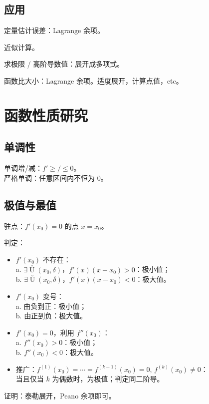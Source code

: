 \documentclass[12pt, a4paper, UTF8, openany]{ctexbook}
\newcommand{\difk}[2]{{#1}^{(#2)}}
\newcommand{\uzero}{\mathop{U}\limits^{\circ}}%
\begin{document}
        \subsection{应用}
        定量估计误差：Lagrange 余项。

        近似计算。

        求极限 / 高阶导数值：展开成多项式。

        函数比大小：Lagrange 余项。适度展开，计算点值，etc。

    \section{函数性质研究}
        \subsection{单调性}
        单调增/减：$f' \geqslant / \leqslant 0$。\\
        严格单调：任意区间内不恒为 0。

        \subsection{极值与最值}
        驻点：$f'(x_0) = 0$ 的点 $x = x_0$。

        判定：
        \begin{itemize}
            \item $f'(x_0)$ 不存在：\\
                a. $\exists \uzero(x_0, \delta)$，$f'(x)(x - x_0) > 0$：极小值；\\
                b. $\exists \uzero(x_0, \delta)$，$f'(x)(x - x_0) < 0$：极大值。
            \item $f'(x_0)$ 变号：\\
                a. 由负到正：极小值；\\
                b. 由正到负：极大值。
            \item $f'(x_0) = 0$，利用 $f''(x_0)$：\\
                a. $f''(x_0) > 0$：极小值；\\
                b. $f''(x_0) < 0$：极大值。
            \item 推广：$\difk{f}{1}(x_0) = \cdots = \difk{f}{k - 1}(x_0) = 0, \, \difk{f}{k}(x_0) \neq 0$：\\
                {\heiti 当且仅当 $k$ 为偶数}时，为极值；判定同二阶导。
        \end{itemize}
        证明：泰勒展开，Peano 余项即可。
\end{document}
